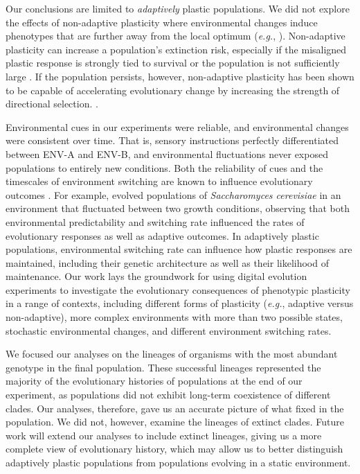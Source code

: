Our conclusions are limited to \textit{adaptively} plastic populations.
We did not explore the effects of non-adaptive plasticity where environmental changes induce phenotypes that are further away from the local optimum (\textit{e.g.}, \citealt{leroi_temperature_1994}).
Non-adaptive plasticity can increase a population's extinction risk, especially if the misaligned plastic response is strongly tied to survival or the population is not sufficiently large \citep{gomulkiewicz_when_1995,chevin_adaptation_2010}.
If the population persists, however, non-adaptive plasticity has been shown to be capable of accelerating evolutionary change by increasing the strength of directional selection. \citep{ghalambor_non-adaptive_2015}.

Environmental cues in our experiments were reliable, and environmental changes were consistent over time. 
That is, sensory instructions perfectly differentiated between ENV-A and ENV-B, and environmental fluctuations never exposed populations to entirely new conditions.
Both the reliability of cues and the timescales of environment switching are known to influence evolutionary outcomes \citep{li_digital_2004,boyer_adaptation_2021}. %
For example, \cite{boyer_adaptation_2021} evolved populations of \textit{Saccharomyces cerevisiae} in an environment that fluctuated between two growth conditions, observing that both environmental predictability and switching rate influenced the rates of evolutionary responses as well as adaptive outcomes. 
In adaptively plastic populations, environmental switching rate can influence how plastic responses are maintained, including their genetic architecture as well as their likelihood of maintenance. 
Our work lays the groundwork for using digital evolution experiments to investigate the evolutionary consequences of phenotypic plasticity in a range of contexts, including different forms of plasticity (\textit{e.g.}, adaptive versus non-adaptive), more complex environments with more than two possible states, stochastic environmental changes, and different environment switching rates.

We focused our analyses on the lineages of organisms with the most abundant genotype in the final population.
These successful lineages represented the majority of the evolutionary histories of populations at the end of our experiment, as populations did not exhibit long-term coexistence of different clades.
Our analyses, therefore, gave us an accurate picture of what fixed in the population.
We did not, however, examine the lineages of extinct clades.
Future work will extend our analyses to include extinct lineages, giving us a more complete view of evolutionary history, which may allow us to better distinguish adaptively plastic populations from populations evolving in a static environment. 

